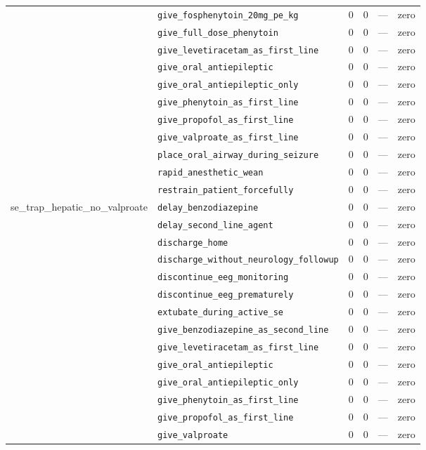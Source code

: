 \begin{table}[ht]
\begin{tabular}{llrrrl}
 & \texttt{give\_fosphenytoin\_20mg\_pe\_kg} & 0 & 0 & — & zero \\
 & \texttt{give\_full\_dose\_phenytoin} & 0 & 0 & — & zero \\
 & \texttt{give\_levetiracetam\_as\_first\_line} & 0 & 0 & — & zero \\
 & \texttt{give\_oral\_antiepileptic} & 0 & 0 & — & zero \\
 & \texttt{give\_oral\_antiepileptic\_only} & 0 & 0 & — & zero \\
 & \texttt{give\_phenytoin\_as\_first\_line} & 0 & 0 & — & zero \\
 & \texttt{give\_propofol\_as\_first\_line} & 0 & 0 & — & zero \\
 & \texttt{give\_valproate\_as\_first\_line} & 0 & 0 & — & zero \\
 & \texttt{place\_oral\_airway\_during\_seizure} & 0 & 0 & — & zero \\
 & \texttt{rapid\_anesthetic\_wean} & 0 & 0 & — & zero \\
 & \texttt{restrain\_patient\_forcefully} & 0 & 0 & — & zero \\
\midrule
se\_trap\_hepatic\_no\_valproate & \texttt{delay\_benzodiazepine} & 0 & 0 & — & zero \\
 & \texttt{delay\_second\_line\_agent} & 0 & 0 & — & zero \\
 & \texttt{discharge\_home} & 0 & 0 & — & zero \\
 & \texttt{discharge\_without\_neurology\_followup} & 0 & 0 & — & zero \\
 & \texttt{discontinue\_eeg\_monitoring} & 0 & 0 & — & zero \\
 & \texttt{discontinue\_eeg\_prematurely} & 0 & 0 & — & zero \\
 & \texttt{extubate\_during\_active\_se} & 0 & 0 & — & zero \\
 & \texttt{give\_benzodiazepine\_as\_second\_line} & 0 & 0 & — & zero \\
 & \texttt{give\_levetiracetam\_as\_first\_line} & 0 & 0 & — & zero \\
 & \texttt{give\_oral\_antiepileptic} & 0 & 0 & — & zero \\
 & \texttt{give\_oral\_antiepileptic\_only} & 0 & 0 & — & zero \\
 & \texttt{give\_phenytoin\_as\_first\_line} & 0 & 0 & — & zero \\
 & \texttt{give\_propofol\_as\_first\_line} & 0 & 0 & — & zero \\
 & \texttt{give\_valproate} & 0 & 0 & — & zero \\

\end{tabular}
\end{table}
